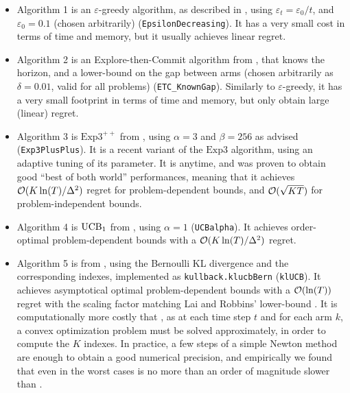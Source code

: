 \begin{itemize}
    \item Algorithm 1 is
    an $\varepsilon$-greedy algorithm, as described in \cite{Bubeck12}, using $\varepsilon_t = \varepsilon_0 / t$, and $\varepsilon_0 = 0.1$ (chosen arbitrarily) (\texttt{EpsilonDecreasing}).
    It has a very small cost in terms of time and memory, but it usually achieves linear regret.

    \item Algorithm 2 is
    an Explore-then-Commit algorithm from \cite{GarivierETC2016}, that knows the horizon, and a lower-bound on the gap between arms (chosen arbitrarily as $\delta=0.01$, valid for all problems) (\texttt{ETC\_KnownGap}).
    Similarly to $\varepsilon$-greedy, it has a very small footprint in terms of time and memory, but only obtain large (linear) regret.

    \item Algorithm 3 is
    $\mathrm{Exp}3^{++}$ from \cite{Seldin17}, using $\alpha=3$ and $\beta=256$ as advised (\texttt{Exp3PlusPlus}).
    It is a recent variant of the $\mathrm{Exp3}$ algorithm, using an adaptive tuning of its parameter. It is anytime, and was proven to obtain good ``best of both world'' performances, meaning that it achieves $\mathcal{O}(K\ln(T)/\Delta^2)$ regret for problem-dependent bounds, and $\mathcal{O}(\sqrt{KT})$ for problem-independent bounds.

    \item Algorithm 4 is
    $\mathrm{UCB}_1$ from \cite{Auer02}, using $\alpha=1$ (\texttt{UCBalpha}).
    It achieves order-optimal problem-dependent bounds with a $\mathcal{O}(K\ln(T)/\Delta^2)$ regret.

    \item Algorithm 5 is
    \klUCB{} from \cite{KLUCBJournal}, using the Bernoulli KL divergence and the corresponding \klUCB{} indexes, implemented as \texttt{kullback.klucbBern} (\texttt{klUCB}).
    It achieves asymptotical optimal problem-dependent bounds with a $\mathcal{O}(\ln(T))$ regret with the scaling factor matching Lai and Robbins' lower-bound \cite{LaiRobbins85}.
    It is computationally more costly that \UCB, as at each time step $t$ and for each arm $k$, a convex optimization problem must be solved approximately, in order to compute the $K$ indexes.
    In practice, a few steps of a simple Newton method are enough to obtain a good numerical precision, and empirically we found that even in the worst cases \klUCB{} is no more than an order of magnitude slower than \UCB.


\end{itemize}
